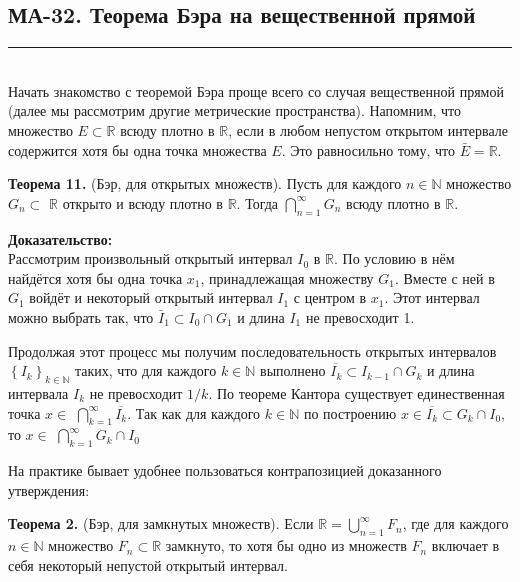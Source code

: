 \documentclass[a4paper,12pt]{article} %
\newcommand{\HRule}{\rule{\linewidth}{0.5mm}}
\begin{document}
	\newpage
	
	\begin{LARGE}
		\begin{center}
			\section{МА-32. Теорема Бэра на вещественной прямой}
		\end{center}
	\end{LARGE}
	\HRule \\

Начать знакомство с теоремой Бэра проще всего со случая вещественной прямой (далее мы рассмотрим другие метрические пространства). Напомним, что множество $E \subset \mathbb{R}$ всюду плотно в $\mathbb{R}$, если в любом непустом открытом интервале содержится хотя бы одна точка множества $E$. Это равносильно тому, что $\bar{E}=\mathbb{R}$.

\textbf{Теорема 11.} (Бэр, для открытых множеств). Пусть для каждого $n \in \mathbb{N}$ множество $G_{n} \subset$ $\mathbb{R}$ открыто и всюду плотно в $\mathbb{R}$. Тогда $\bigcap_{n=1}^{\infty} G_{n}$ всюду плотно в $\mathbb{R}$.

\textbf{Доказательство:\\}
Рассмотрим произвольный открытый интервал $I_{0}$ в $\mathbb{R}$. По условию в нём найдётся хотя бы одна точка $x_{1}$, принадлежащая множеству $G_{1}$. Вместе с ней в $G_{1}$ войдёт и некоторый открытый интервал $I_{1}$ с центром в $x_{1}$. Этот интервал можно выбрать так, что $\bar{I}_{1} \subset I_{0} \cap G_{1}$ и длина $I_{1}$ не превосходит 1.

Продолжая этот процесс мы получим последовательность открытых интервалов $\left\{I_{k}\right\}_{k \in \mathbb{N}}$ таких, что для каждого $k \in \mathbb{N}$ выполнено $\overline{I_{k}} \subset I_{k-1} \cap G_{k}$ и длина интервала $I_{k}$ не превосходит $1 / k$. По теореме Кантора существует единественная точка $x \in$ $\bigcap_{k=1}^{\infty} \overline{I_{k}}$. Так как для каждого $k \in \mathbb{N}$ по построению $x \in \overline{I_{k}} \subset G_{k} \cap I_{0}$, то $x \in$ $\bigcap_{k=1}^{\infty} G_{k} \cap I_{0}$

На практике бывает удобнее пользоваться контрапозицией доказанного утверждения:

\textbf{Теорема 2.} (Бэр, для замкнутых множеств). Если $\mathbb{R}=\bigcup_{n=1}^{\infty} F_{n}$, где для каждого $n \in \mathbb{N}$ множество $F_{n} \subset \mathbb{R}$ замкнуто, то хотя бы одно из множеств $F_{n}$ включает в себя некоторый непустой открытый интервал.
\end{document}
